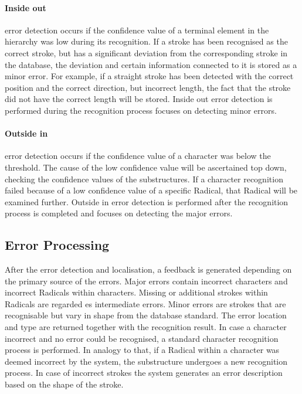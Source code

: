 \paragraph{Inside out} error detection occurs if the confidence value of a 
terminal element in the hierarchy was low during its recognition. 
If a stroke has been recognised as the correct stroke, but has a significant 
deviation from the corresponding stroke in the database, the deviation and 
certain information connected to it is stored as a minor error.
For example, if a straight stroke has been detected with the correct position
and the correct direction, but incorrect length, the fact that the stroke
did not have the correct length will be stored. Inside out error detection
is performed during the recognition process focuses on detecting minor errors.

\paragraph{Outside in} error detection occurs if the confidence value of a 
character was below the threshold. The cause of the low confidence value will be 
ascertained top down, checking the confidence values of the substructures.
If a character recognition failed because of a low confidence value of
a specific Radical, that Radical will be examined further.
Outside in error detection is performed after the recognition process is 
completed and focuses on detecting the major errors.

\subsection{Error Processing}
\label{sec:hwre:errorprocessing}

After the error detection and localisation, a feedback is generated 
depending on the primary source of the errors. Major errors contain incorrect 
characters and incorrect Radicals within characters.
Missing or additional strokes within Radicals are regarded es intermediate
errors. Minor errors are strokes that are recognisable but vary in shape from 
the database standard. The error location and type are returned together with 
the recognition result. In case a character incorrect and no error could be 
recognised, a standard character recognition process is performed.
In analogy to that, if a Radical within a character was deemed incorrect by
the system, the substructure undergoes a new recognition process.
In case of incorrect strokes the system generates an error description based
on the shape of the stroke.



